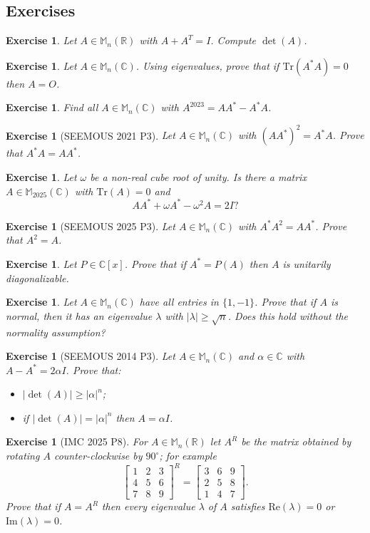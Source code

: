 \documentclass[12pt]{article}
\renewcommand{\Tr}{\mathrm{Tr}}
\theoremstyle{breakplain}
\theoremstyle{breakdef}
\newtheorem{ex}[subsubsection]{Exercise}
\theoremstyle{remark}
\begin{document}
\subsection{Exercises}
\begin{ex}
    Let $A\in \mathbb{M}_n(\mathbb{R})$ with $A+A^T=I$. Compute $\det(A)$.
\end{ex}
\begin{ex}
    Let $A\in \mathbb{M}_n(\mathbb{C})$. Using eigenvalues, prove that if $\Tr(A^*A)=0$ then $A=O$.
\end{ex}
\begin{ex}
    Find all $A\in \mathbb{M}_n(\mathbb{C})$ with $A^{2023}=AA^*-A^*A$.
\end{ex}
\begin{ex}[SEEMOUS 2021 P3]\label{S21P3}
    Let $A\in \mathbb{M}_n(\mathbb{C})$ with $(AA^*)^2=A^*A$. Prove that $A^*A=AA^*$.
\end{ex}
\begin{ex}
    Let $\omega$ be a non-real cube root of unity. Is there a matrix $A\in \mathbb{M}_{2025}(\mathbb{C})$ with $\Tr(A)=0$ and
    \[AA^*+\omega A^*-\omega^2A=2I?\]
\end{ex}
\begin{ex}[SEEMOUS 2025 P3]\label{S25P3}
    Let $A\in \mathbb{M}_n(\mathbb{C})$ with $A^*A^2=AA^*$. Prove that $A^2=A$.
\end{ex}
\begin{ex}
    Let $P\in \mathbb{C}[x]$. Prove that if $A^*=P(A)$ then $A$ is unitarily diagonalizable.
\end{ex}
\begin{ex}
    Let $A\in \mathbb{M}_n(\mathbb{C})$ have all entries in $\{1,-1\}$.
    Prove that if $A$ is normal, then it has an eigenvalue $\lambda$ with $|\lambda|\geq \sqrt{n}$. Does this hold without the normality assumption?
\end{ex}
\begin{ex}[SEEMOUS 2014 P3]
    Let $A\in \mathbb{M}_n(\mathbb{C})$ and $\alpha\in \mathbb{C}$ with $A-A^*=2\alpha I$. Prove that:
    \begin{itemize}
        \item $|\det(A)|\geq |\alpha|^n$;
        \item if $|\det(A)|=|\alpha|^n$ then $A=\alpha I$.
    \end{itemize}
\end{ex}
\begin{ex}[IMC 2025 P8]
    For $A\in \mathbb{M}_n(\mathbb{R})$ let $A^R$ be the matrix obtained by rotating $A$ counter-clockwise by $90^\circ$; for example
    \[\begin{bmatrix}
    1 & 2 & 3 \\
    4 & 5 & 6 \\
    7 & 8 & 9
    \end{bmatrix}^{R}
    =
    \begin{bmatrix}
    3 & 6 & 9 \\
    2 & 5 & 8 \\
    1 & 4 & 7
    \end{bmatrix}.\]
    Prove that if $A=A^R$ then every eigenvalue $\lambda$ of $A$ satisfies $\mathrm{Re}(\lambda)=0$ or $\mathrm{Im}(\lambda)=0$.
\end{ex}
\end{document}
